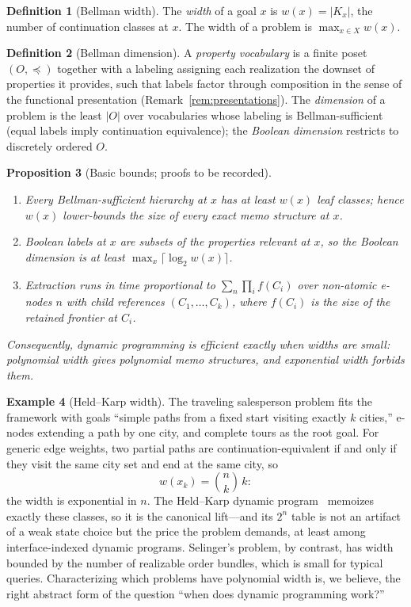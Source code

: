 \documentclass[sigconf,nonacm]{acmart}
\theoremstyle{definition}
\newtheorem{definition}{Definition}[section]
\newtheorem{example}[definition]{Example}
\theoremstyle{plain}
\newtheorem{proposition}[definition]{Proposition}
\theoremstyle{remark}
\begin{document}
\begin{definition}[Bellman width]
\label{def:width}
The \emph{width} of a goal $x$ is $w(x)=|K_x|$, the number of
continuation classes at $x$.  The width of a problem is
$\max_{x\in X}w(x)$.
\end{definition}

\begin{definition}[Bellman dimension]
\label{def:dimension}
A \emph{property vocabulary} is a finite poset $(O,\preceq)$
together with a labeling assigning each realization the downset of
properties it provides, such that labels factor through composition
in the sense of the functional presentation
(Remark~\ref{rem:presentations}).  The \emph{dimension} of a problem
is the least $|O|$ over vocabularies whose labeling is
Bellman-sufficient (equal labels imply continuation equivalence);
the \emph{Boolean dimension} restricts to discretely ordered $O$.
\end{definition}

\begin{proposition}[Basic bounds; proofs to be recorded]
\label{prop:bounds}
\begin{enumerate}
\item Every Bellman-sufficient hierarchy at $x$ has at least $w(x)$
  leaf classes; hence $w(x)$ lower-bounds the size of every exact
  memo structure at $x$.
\item Boolean labels at $x$ are subsets of the properties relevant
  at $x$, so the Boolean dimension is at least
  $\max_x\lceil\log_2 w(x)\rceil$.
\item Extraction runs in time proportional to
  $\sum_{n}\prod_{i} f(C_i)$ over non-atomic e-nodes $n$ with child
  references $(C_1,\ldots,C_k)$, where $f(C_i)$ is the size of the
  retained frontier at $C_i$.
\end{enumerate}
Consequently, dynamic programming is efficient exactly when widths
are small: polynomial width gives polynomial memo structures, and
exponential width forbids them.
\end{proposition}

\begin{example}[Held--Karp width]
\label{ex:heldkarp}
The traveling salesperson problem fits the framework with goals
``simple paths from a fixed start visiting exactly $k$ cities,''
e-nodes extending a path by one city, and complete tours as the root
goal.  For generic edge weights, two partial paths are
continuation-equivalent if and only if they visit the same city set
and end at the same city, so
\[
w(x_k)=\binom{n}{k}\,k :
\]
the width is exponential in $n$.  The Held--Karp dynamic
program~\cite{heldkarp1962} memoizes exactly these classes, so it is
the canonical lift---and its $2^n$ table is not an artifact of a
weak state choice but the price the problem demands, at least among
interface-indexed dynamic programs.  Selinger's problem, by
contrast, has width bounded by the number of realizable order
bundles, which is small for typical queries.  Characterizing which
problems have polynomial width is, we believe, the right abstract
form of the question ``when does dynamic programming work?''
\end{example}
\end{document}
